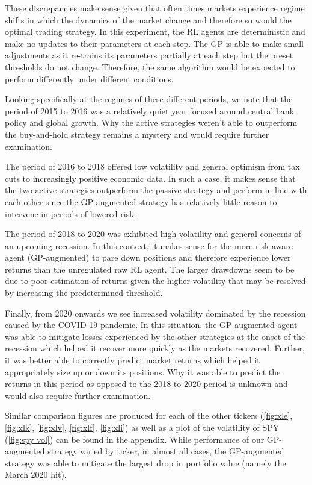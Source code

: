 \documentclass[12pt]{article}
\begin{document}
These discrepancies make sense given that often times markets experience regime shifts in which the dynamics of the market change and therefore so would the optimal trading strategy. In this experiment, the RL agents are deterministic and make no updates to their parameters at each step. The GP is able to make small adjustments as it re-trains its parameters partially at each step but the preset thresholds do not change. Therefore, the same algorithm would be expected to perform differently under different conditions. 

Looking specifically at the regimes of these different periods, we note that the period of 2015 to 2016 was a relatively quiet year focused around central bank policy and global growth. Why the active strategies weren't able to outperform the buy-and-hold strategy remains a mystery and would require further examination.

The period of 2016 to 2018 offered low volatility and general optimism from tax cuts to increasingly positive economic data. In such a case, it makes sense that the two active strategies outperform the passive strategy and perform in line with each other since the GP-augmented strategy has relatively little reason to intervene in periods of lowered risk.

The period of 2018 to 2020 was exhibited high volatility and general concerns of an upcoming recession. In this context, it makes sense for the more risk-aware agent (GP-augmented) to pare down positions and therefore experience lower returns than the unregulated raw RL agent. The larger drawdowns seem to be due to poor estimation of returns given the higher volatility that may be resolved by increasing the predetermined threshold.

Finally, from 2020 onwards we see increased volatility dominated by the recession caused by the COVID-19 pandemic. In this situation, the GP-augmented agent was able to mitigate losses experienced by the other strategies at the onset of the recession which helped it recover more quickly as the markets recovered. Further, it was better able to correctly predict market returns which helped it appropriately size up or down its positions. Why it was able to predict the returns in this period as opposed to the 2018 to 2020 period is unknown and would also require further examination.

Similar comparison figures are produced for each of the other tickers (\ref{fig:xle}, \ref{fig:xlk}, \ref{fig:xlv}, \ref{fig:xlf}, \ref{fig:xli}) as well as a plot of the volatility of SPY (\ref{fig:spy vol}) can be found in the appendix. While performance of our GP-augmented strategy varied by ticker, in almost all cases, the GP-augmented strategy was able to mitigate the largest drop in portfolio value (namely the March 2020 hit).
\end{document}
